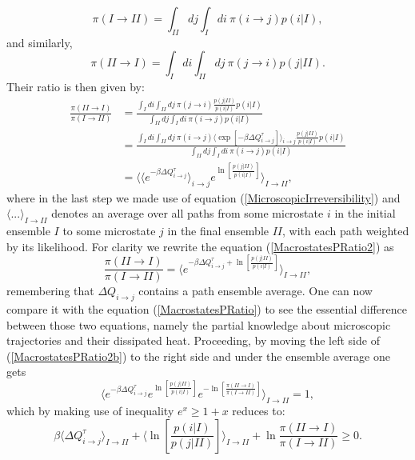 \documentclass[a4paper,12pt]{article}
\begin{document}
\begin{equation}
  \pi (I\to II)=\int_{II} d j \int_I d i\ \pi(i\to j)p(i|I),
\end{equation}
and similarly,
\begin{equation}
  \pi (II\to I)=\int_{I} d i \int_{II} d j\ \pi(j\to i)p(j|II).
\end{equation}
Their ratio is then given by:
\begin{equation}
\begin{aligned}
\label{MacrostatesPRatio2}
  \frac{\pi(II \to I)}{\pi(I \to II)} &= \frac{\int_{I} d i \int_{II} d j\ \pi(j\to i)\frac{p(j|II)}{p(i|I)}p(i|I)}{\int_{II} d j \int_I d i\ \pi(i\to j)p(i|I)}\\
  &= \frac{\int_{I} d i \int_{II} d j\ \pi(i\to j) \langle \exp[- \beta \Delta Q_{i\to j}^{\tau}] \rangle_{i \to j}  \frac{p(j|II)}{p(i|I)}p(i|I)}{\int_{II} d j \int_I d i\ \pi(i\to j) p(i|I)}\\
  &=\langle \langle e^{- \beta \Delta Q_{i\to j}^{\tau}} \rangle_{i \to j} e^{\ln[\frac{p(j|II)}{p(i|I)}]} \rangle_{I \to II},
\end{aligned}
\end{equation}
where in the last step we made use of equation (\ref{MicroscopicIrreversibility}) and  $\langle ... \rangle_{I \to II}$ denotes an average over all paths from some microstate
$i$ in the initial ensemble $I$ to some microstate $j$ in the final ensemble $II$, with each path weighted by its likelihood.
For clarity we rewrite the equation (\ref{MacrostatesPRatio2}) as 
\begin{equation}
\label{MacrostatesPRatio2b}
  \frac{\pi(II \to I)}{\pi(I \to II)} 
  =\langle e^{- \beta \Delta Q_{i\to j}^{\tau} + \ln[\frac{p(j|II)}{p(i|I)}]} \rangle_{I \to II},
\end{equation}
remembering that $\Delta Q_{i \to j}$ contains a path ensemble average. One can now compare it with the equation (\ref{MacrostatesPRatio}) to see the essential difference between those two equations, namely the partial knowledge about microscopic trajectories and their dissipated heat.
Proceeding, by moving the left side of (\ref{MacrostatesPRatio2b}) to the right side and under the ensemble average one gets
\begin{equation}
\langle  e^{- \beta \Delta Q_{i\to j}^{\tau}} e^{\ln[\frac{p(j|II)}{p(i|I)}]} e^{-\ln[\frac{\pi(II \to I)}{\pi(I \to II)}]} \rangle_{I \to II}=1,
\end{equation}
which by making use of inequality $e^x \geq 1+x$ reduces to:
\begin{equation}
  \beta \langle\Delta Q_{i\to j}^{\tau} \rangle_{I \to II}+\langle \ln[\frac{p(i|I)}{p(j|II)}]  \rangle_{I \to II}+ \ln{\frac{\pi(II \to I)}{\pi(I \to II)}} \geq 0.
\end{equation}
\end{document}

